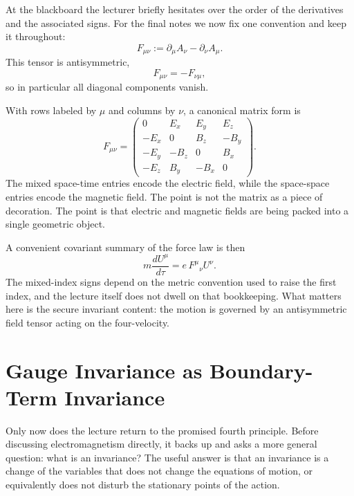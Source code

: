 At the blackboard the lecturer briefly hesitates over the order of the derivatives and the associated signs. For the final notes we now fix one convention and keep it throughout:
\begin{equation}
F_{\mu\nu}:=\partial_\mu A_\nu-\partial_\nu A_\mu.
\end{equation}
This tensor is antisymmetric,
\begin{equation}
F_{\mu\nu}=-F_{\nu\mu},
\end{equation}
so in particular all diagonal components vanish.

With rows labeled by \(\mu\) and columns by \(\nu\), a canonical matrix form is
\begin{equation}
F_{\mu\nu}
=
\begin{pmatrix}
0 & E_x & E_y & E_z \\
-E_x & 0 & B_z & -B_y \\
-E_y & -B_z & 0 & B_x \\
-E_z & B_y & -B_x & 0
\end{pmatrix}.
\end{equation}
The mixed space-time entries encode the electric field, while the space-space entries encode the magnetic field. The point is not the matrix as a piece of decoration. The point is that electric and magnetic fields are being packed into a single geometric object.

A convenient covariant summary of the force law is then
\begin{equation}
m\frac{dU^\mu}{d\tau}=e\,F^\mu{}_{\nu}U^\nu.
\end{equation}
The mixed-index signs depend on the metric convention used to raise the first index, and the lecture itself does not dwell on that bookkeeping. What matters here is the secure invariant content: the motion is governed by an antisymmetric field tensor acting on the four-velocity.

\section{Gauge Invariance as Boundary-Term Invariance}

Only now does the lecture return to the promised fourth principle. Before discussing electromagnetism directly, it backs up and asks a more general question: what is an invariance? The useful answer is that an invariance is a change of the variables that does not change the equations of motion, or equivalently does not disturb the stationary points of the action.

